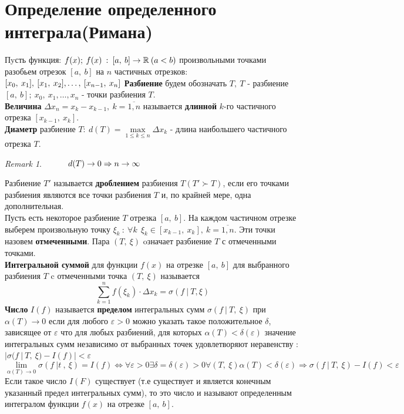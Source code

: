 \documentclass[a4paper,12pt, centered]{bookest}
\theoremstyle{remark}
\newtheorem*{remark}{Remark}
\newcommand\tab[1][1cm]{\hspace*{#1}}
\begin{document}
\section{Определение определенного интеграла(Римана)}
Пyсть функция: $f(x);\> f(x)\>:\>[a,\>b]\rightarrow\mathbb{R}\>(a<b)\\$
произвольными точками разобьем отрезок $[a,\>b]$ на $n$ частичных отрезков: $[x_0,\>x_1],\>[x_1,\>x_2],\dots,\>[x_{n-1},\>x_n]\\$ 
\textbf{Разбиение} будем обозначать $T,\>T$ - разбиение $[a,\>b];\>x_0,\>x_1,\dots,x_n$ - точки разбиения $T$.\\
\textbf{Величина} $\Delta x_n=x_k-x_{k-1},\>k=\overline{1,n}$ называется \textbf{длинной} $k$-го частичного отрезка $[x_{k-1},\>x_k]$.\\
\textbf{Диаметр} разбиение $T:\>d(T)=\underset{1\leq k\leq n}{\max}\Delta x_k$ - длина наибольшего частичного отрезка $T$.\\
\begin{remark}
	$\tab d(T)\rightarrow0\Rightarrow n\rightarrow\infty$
\end{remark}
Разбиение $T'$ называется \textbf{дроблением} разбиения $T(T'\succ T)$, если его точками разбиения являются все точки разбиения $T$ и, по крайней мере, одна дополнительная.\\
Пусть есть некоторое разбиение $T$ отрезка $[a,\>b]$. На каждом частичном отрезке выберем произвольную точку $\xi_k\>:\>\forall k\>\> \xi_k \in [x_{k-1},\>x_k],\>k=\overline{1,n}.$
Эти точки назовем \textbf{отмеченными}. Пара $(T,\>\xi)$ oзначает разбиение $T$ с отмеченными точками.\\
\textbf{Интегральной суммой} для функции $f(x)$ на отрезке $[a,\>b]$ для выбранного разбиения $T$ c отмеченными точка $(T,\>\xi)$ называется 
$$\sum\limits_{k=1}^n f(\xi_k)\cdot\Delta x_k=\sigma(f\>|\>T,\xi)$$
\textbf{Число} $I(f)$ называется \textbf{пределом} интегральных сумм $\sigma(f\>|\>T,\>\xi)$ при $\alpha(T)\to0$ если для любого $\varepsilon>0$ можно указать такое положительное $\delta$, зависящее от $\varepsilon$ что для любых разбиений, для которых $\alpha(T)<\delta(\varepsilon)$ значение интегральных сумм независимо от выбранных точек удовлетворяют неравенству : $|\sigma(f\>|\>T,\>\xi)-I(f)|<\varepsilon$
$$\lim_{\alpha(T)\to0}\sigma(f\>|t\>,\>\xi)=I(f)\Leftrightarrow\forall\varepsilon>0\exists\delta=\delta(\varepsilon)>0\forall(T,\>\xi)\alpha(T)<\delta(\varepsilon)\Rightarrow\sigma(f\>|\>T,\>\xi)-I(f)<\varepsilon$$
Если такое число $I(F)$ существует (т.е существует и является конечным указанный предел интегральных сумм), то это число и называют определенным интегралом функции $f(x)$ на отрезке $[a,\>b]$.
\end{document}
